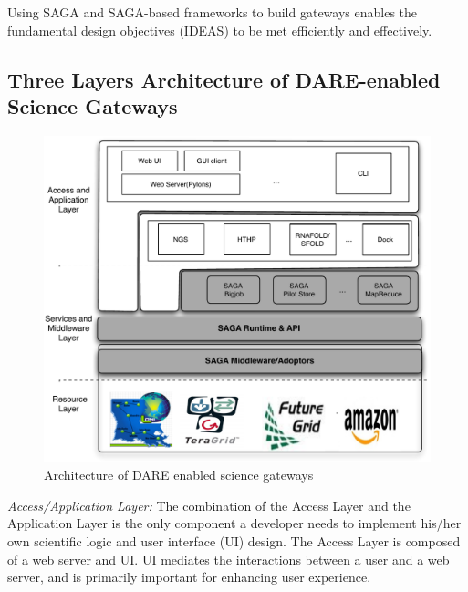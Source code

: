 \documentclass{sig-alternate}
\begin{document}
Using SAGA and SAGA-based frameworks to build gateways enables the
fundamental design objectives (IDEAS) to be met efficiently and
effectively.



\subsection{Three Layers Architecture of DARE-enabled Science
  Gateways}

\begin{figure}
  \centering
  \includegraphics[scale=0.40]{figures/DAREOutline.pdf}
\caption{\small Architecture of DARE enabled science gateways }
  \label{fig:dare-arch} 
\end{figure}

\textit{Access/Application Layer:} The combination of the Access Layer
and the Application Layer is the only component a developer needs to
implement his/her own scientific logic and user interface (UI)
design.  The Access Layer is composed of a web server and UI.  UI
mediates the interactions between a user and a web server, and is
primarily important for enhancing user experience.  
\end{document}
